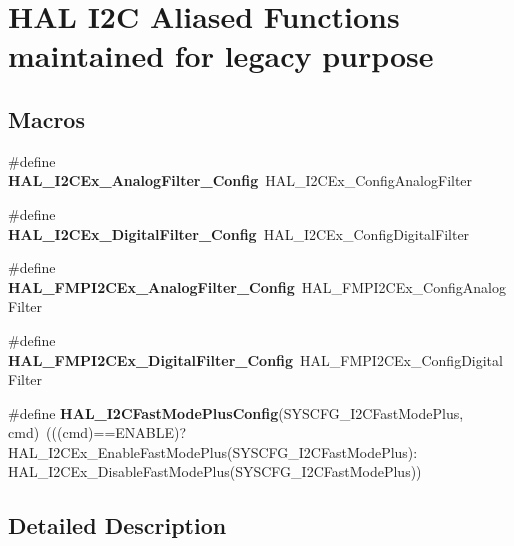 \hypertarget{group___h_a_l___i2_c___aliased___functions}{}\section{H\+AL I2C Aliased Functions maintained for legacy purpose}
\label{group___h_a_l___i2_c___aliased___functions}
\subsection*{Macros}
\begin{DoxyCompactItemize}
\item 
\mbox{\label{group___h_a_l___i2_c___aliased___functions_ga29a6d7298eb9b8290229e37a6eee9c21}} 
\#define {\bfseries H\+A\+L\+\_\+\+I2\+C\+Ex\+\_\+\+Analog\+Filter\+\_\+\+Config}~H\+A\+L\+\_\+\+I2\+C\+Ex\+\_\+\+Config\+Analog\+Filter
\item 
\mbox{\label{group___h_a_l___i2_c___aliased___functions_gad145cb83d816a71f5f8085e5abb9cf8a}} 
\#define {\bfseries H\+A\+L\+\_\+\+I2\+C\+Ex\+\_\+\+Digital\+Filter\+\_\+\+Config}~H\+A\+L\+\_\+\+I2\+C\+Ex\+\_\+\+Config\+Digital\+Filter
\item 
\mbox{\label{group___h_a_l___i2_c___aliased___functions_gab58dc8da5184549e6b0ada3895968b2d}} 
\#define {\bfseries H\+A\+L\+\_\+\+F\+M\+P\+I2\+C\+Ex\+\_\+\+Analog\+Filter\+\_\+\+Config}~H\+A\+L\+\_\+\+F\+M\+P\+I2\+C\+Ex\+\_\+\+Config\+Analog\+Filter
\item 
\mbox{\label{group___h_a_l___i2_c___aliased___functions_ga26c863f7dd300fa407da0a808888c8d2}} 
\#define {\bfseries H\+A\+L\+\_\+\+F\+M\+P\+I2\+C\+Ex\+\_\+\+Digital\+Filter\+\_\+\+Config}~H\+A\+L\+\_\+\+F\+M\+P\+I2\+C\+Ex\+\_\+\+Config\+Digital\+Filter
\item 
\mbox{\label{group___h_a_l___i2_c___aliased___functions_ga340e0d97db96b108c18718d4b37bdb29}} 
\#define {\bfseries H\+A\+L\+\_\+\+I2\+C\+Fast\+Mode\+Plus\+Config}(S\+Y\+S\+C\+F\+G\+\_\+\+I2\+C\+Fast\+Mode\+Plus,  cmd)~(((cmd)==E\+N\+A\+B\+LE)? H\+A\+L\+\_\+\+I2\+C\+Ex\+\_\+\+Enable\+Fast\+Mode\+Plus(S\+Y\+S\+C\+F\+G\+\_\+\+I2\+C\+Fast\+Mode\+Plus)\+: H\+A\+L\+\_\+\+I2\+C\+Ex\+\_\+\+Disable\+Fast\+Mode\+Plus(S\+Y\+S\+C\+F\+G\+\_\+\+I2\+C\+Fast\+Mode\+Plus))
\end{DoxyCompactItemize}


\subsection{Detailed Description}
